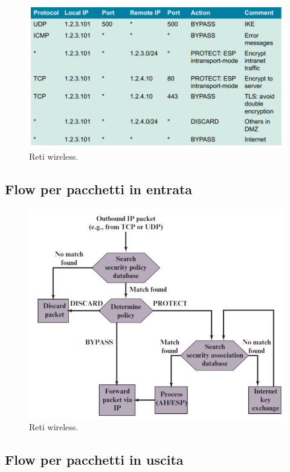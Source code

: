 \begin{figure}[h]
    \centering
    \includegraphics[width=1\textwidth]{images/chapter9/9-2.png}
    \caption{Reti wireless.}
    \label{fig:9-2}
\end{figure}

\subsection{Flow per pacchetti in entrata}

\begin{figure}[h]
    \centering
    \includegraphics[width=1\textwidth]{images/chapter9/9-3.png}
    \caption{Reti wireless.}
    \label{fig:9-3}
\end{figure}

\subsection{Flow per pacchetti in uscita}

